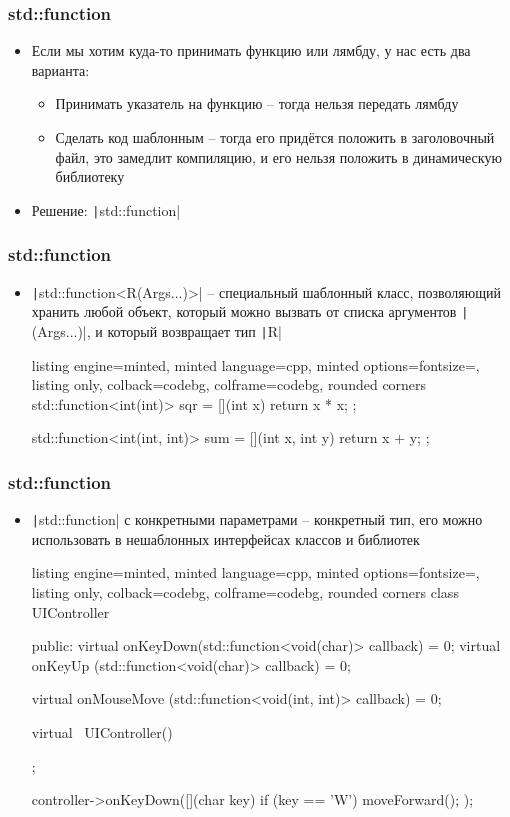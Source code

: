 \documentclass[10pt]{beamer}
\begin{document}
\begin{frame}[fragile]
\frametitle{std::function}
\begin{itemize}
\item Если мы хотим куда-то принимать функцию или лямбду, у нас есть два варианта:
\pause
\begin{itemize}
\item Принимать указатель на функцию -- тогда нельзя передать лямбду
\pause
\item Сделать код шаблонным -- тогда его придётся положить в заголовочный файл, это замедлит компиляцию, и его нельзя положить в динамическую библиотеку
\end{itemize}
\pause
\item Решение: \texttt|std::function|
\end{itemize}
\end{frame}

\begin{frame}[fragile]
\frametitle{std::function}
\begin{itemize}
\item \texttt|std::function<R(Args...)>| -- специальный шаблонный класс, позволяющий хранить любой объект, который можно вызвать от списка аргументов \texttt|(Args...)|, и который возвращает тип \texttt|R|
\pause
{}
\begin{tcblisting}{listing engine=minted, minted language=cpp, minted options={fontsize=\scriptsize}, listing only, colback=codebg, colframe=codebg, rounded corners}
std::function<int(int)> sqr = [](int x){
  return x * x;
};

std::function<int(int, int)> sum = [](int x, int y){
  return x + y;
};
\end{tcblisting}
\end{itemize}
\end{frame}

\begin{frame}[fragile]
\frametitle{std::function}
\begin{itemize}
\item \texttt|std::function| с конкретными параметрами -- конкретный тип, его можно использовать в нешаблонных интерфейсах классов и библиотек
\pause
{}
\begin{tcblisting}{listing engine=minted, minted language=cpp, minted options={fontsize=\scriptsize}, listing only, colback=codebg, colframe=codebg, rounded corners}
class UIController {
public:
  virtual onKeyDown(std::function<void(char)> callback) = 0;
  virtual onKeyUp  (std::function<void(char)> callback) = 0;

  virtual onMouseMove
    (std::function<void(int, int)> callback) = 0;

  virtual ~UIController() {}
};

controller->onKeyDown([](char key){
  if (key == 'W') {
    moveForward();
  }
});
\end{tcblisting}
\end{itemize}
\end{frame}
\end{document}
